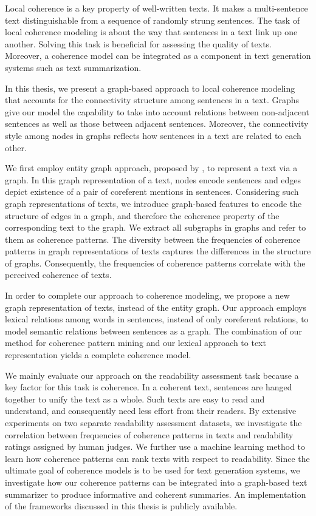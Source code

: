 
\addchap*{\abstractname}

Local coherence is a key property of well-written texts. It makes a multi-sentence text distinguishable from a sequence of randomly strung sentences. 
The task of local coherence modeling is about the way that sentences in a text link up one another.  
Solving this task is beneficial for assessing the quality of texts. 
Moreover, a coherence model can be integrated as a component in text generation systems such as text summarization. 

In this thesis, we present a graph-based approach to local coherence modeling that accounts for the connectivity structure among sentences in a text. 
Graphs give our model the capability to take into account relations between non-adjacent sentences as well as those between adjacent sentences. 
Moreover, the connectivity style among nodes in graphs reflects how sentences in a text are related to each other. 

We first employ entity graph approach, proposed by , to represent a text via a graph. 
In this graph representation of a text, nodes encode sentences and edges depict existence of a pair of coreferent mentions in sentences.    
Considering such graph representations of texts, we introduce graph-based features to encode the structure of edges in a graph, and therefore the coherence property of the corresponding text to the graph.   
We extract all subgraphs in graphs and refer to them as coherence patterns. 
The diversity between the frequencies of coherence patterns in graph representations of texts captures the differences in the structure of graphs.  
Consequently, the frequencies of coherence patterns correlate with the perceived coherence of texts.  

In order to complete our approach to coherence modeling, we propose a new graph representation of texts, instead of the entity graph.  
Our approach employs lexical relations among words in sentences, instead of only coreferent relations, to model semantic relations between sentences as a graph. 
The combination of our method for coherence pattern mining and our lexical approach to text representation yields a complete coherence model. 

We mainly evaluate our approach on the readability assessment task because a key factor for this task is coherence. 
In a coherent text, sentences are hanged together to unify the text as a whole. 
Such texts are easy to read and understand, and consequently need less effort from their readers. 
By extensive experiments on two separate readability assessment datasets, 
we investigate the correlation between frequencies of coherence patterns in texts and readability ratings assigned by human judges.    
We further use a machine learning method to learn how coherence patterns can rank texts with respect to readability. 
Since the ultimate goal of coherence models is to be used for text generation systems, we investigate how our coherence patterns can be integrated into a graph-based text summarizer to produce informative and coherent summaries. 
An implementation of the frameworks discussed in this thesis is publicly available.

\addchap*{\abstractname}




